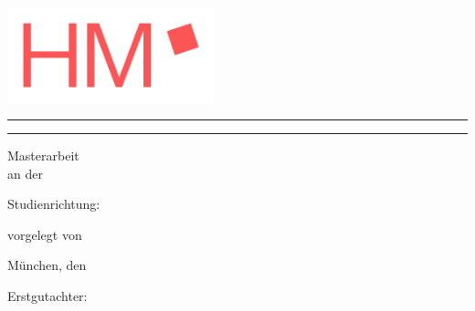 \thispagestyle{empty}

\begin{flushright}
\includegraphics[width=6cm,keepaspectratio]{logos/university_logo}
\end{flushright}

\vspace*{1cm}

\noindent\rule{\linewidth}{0.5mm}

\vspace{1cm}

\begin{flushright}
  \sffamily\bfseries\LARGE
  \getTitle
  
  \vspace{0.5cm}
  
  {\Large\getAuthor}
\end{flushright}

\vspace{1cm}

\noindent\rule{\linewidth}{0.5mm}


\begin{center}
  \large
  Masterarbeit\\
  \vspace{0.5cm}
  an der \getUniversity\\
  \getFaculty
  
  \vspace{1cm}
  
  Studienrichtung: \getCourse
  
  \vspace{1cm}
  
  vorgelegt von\\
  \getAuthor
  
  
  München, den \getSubmissionDate
  
  \vspace{1cm}
  
  Erstgutachter: \getSupervisor
\end{center}